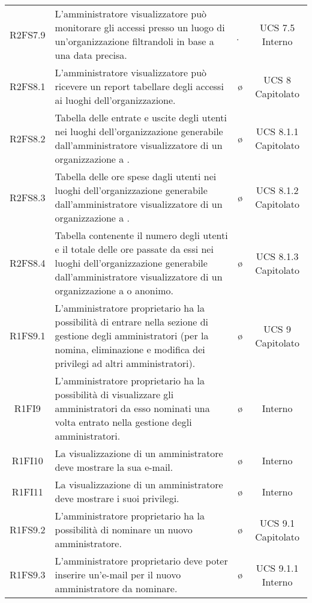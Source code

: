 {\begin{longtable}{ c C{6.5cm} c c}
R2FS7.9 & L'amministratore visualizzatore può monitorare gli accessi presso un luogo di un'organizzazione filtrandoli in base a una data precisa. & \d & UCS 7.5 Interno\\

R2FS8.1 & L'amministratore visualizzatore può ricevere un report tabellare degli accessi ai luoghi dell'organizzazione. & \o & UCS 8 Capitolato\\

R2FS8.2 &  Tabella delle entrate e uscite degli utenti nei luoghi dell'organizzazione generabile dall'amministratore visualizzatore di un organizzazione a . & \o & UCS 8.1.1 Capitolato\\

R2FS8.3 & Tabella delle ore spese dagli utenti nei luoghi dell'organizzazione generabile dall'amministratore visualizzatore di un organizzazione a . & \o & UCS 8.1.2 Capitolato\\

R2FS8.4 & Tabella contenente il numero degli utenti e il totale delle ore passate da essi nei luoghi dell'organizzazione generabile dall'amministratore visualizzatore di un organizzazione a  o anonimo. & \o & UCS 8.1.3 Capitolato\\


R1FS9.1 & L'amministratore proprietario ha la possibilità di entrare nella sezione di gestione degli amministratori (per la nomina, eliminazione e modifica dei privilegi ad altri amministratori). & \o & UCS 9 Capitolato \\

R1FI9 & L'amministratore proprietario ha la possibilità di visualizzare gli amministratori da esso nominati una volta entrato nella gestione degli amministratori. & \o & Interno \\

R1FI10 & La visualizzazione di un amministratore deve mostrare la sua e-mail. & \o & Interno \\

R1FI11 & La visualizzazione di un amministratore deve mostrare i suoi privilegi. & \o & Interno \\

R1FS9.2 & L'amministratore proprietario ha la possibilità di nominare un nuovo amministratore. & \o & UCS 9.1 Capitolato\\

R1FS9.3 & L'amministratore proprietario deve poter inserire un'e-mail per il nuovo amministratore da nominare. & \o & UCS 9.1.1 Interno\\


\end{longtable}}
